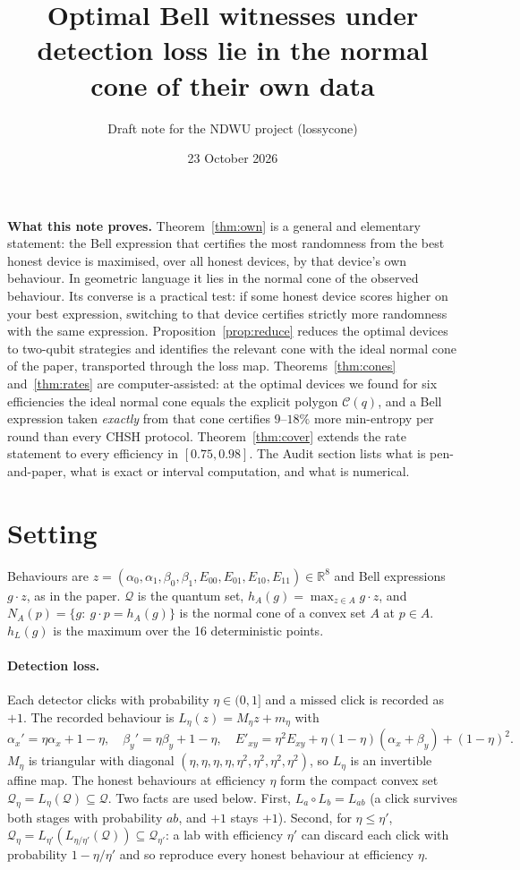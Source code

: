 \documentclass[11pt]{article}
\title{Optimal Bell witnesses under detection loss lie in the normal cone of their own data}
\author{Draft note for the NDWU project (lossycone)}
\date{23 October 2026}
\theoremstyle{definition}\newtheorem{definition}{Definition}
\theoremstyle{remark}\newtheorem{remark}{Remark}
\newcommand{\Q}{\mathcal Q}
\newcommand{\R}{\mathbb R}
\begin{document}
\maketitle

\noindent\textbf{What this note proves.} Theorem~\ref{thm:own} is a general and elementary statement: the Bell expression that certifies the most randomness from the best honest device is maximised, over all honest devices, by that device's own behaviour. In geometric language it lies in the normal cone of the observed behaviour. Its converse is a practical test: if some honest device scores higher on your best expression, switching to that device certifies strictly more randomness with the same expression. Proposition~\ref{prop:reduce} reduces the optimal devices to two-qubit strategies and identifies the relevant cone with the ideal normal cone of the paper, transported through the loss map. Theorems~\ref{thm:cones} and~\ref{thm:rates} are computer-assisted: at the optimal devices we found for six efficiencies the ideal normal cone equals the explicit polygon $\mathcal C(q)$, and a Bell expression taken \emph{exactly} from that cone certifies $9$--$18\%$ more min-entropy per round than every CHSH protocol. Theorem~\ref{thm:cover} extends the rate statement to every efficiency in $[0.75,0.98]$. The Audit section lists what is pen-and-paper, what is exact or interval computation, and what is numerical.

\section{Setting}
Behaviours are $z=(\alpha_0,\alpha_1,\beta_0,\beta_1,E_{00},E_{01},E_{10},E_{11})\in\R^8$ and Bell expressions $g\cdot z$, as in the paper. $\Q$ is the quantum set, $h_A(g)=\max_{z\in A}g\cdot z$, and $N_A(p)=\{g:\ g\cdot p=h_A(g)\}$ is the normal cone of a convex set $A$ at $p\in A$. $h_L(g)$ is the maximum over the 16 deterministic points.

\paragraph{Detection loss.} Each detector clicks with probability $\eta\in(0,1]$ and a missed click is recorded as $+1$. The recorded behaviour is $L_\eta(z)=M_\eta z+m_\eta$ with
\[
\alpha_x'=\eta\alpha_x+1-\eta,\quad \beta_y'=\eta\beta_y+1-\eta,\quad E'_{xy}=\eta^2E_{xy}+\eta(1-\eta)(\alpha_x+\beta_y)+(1-\eta)^2 .
\]
$M_\eta$ is triangular with diagonal $(\eta,\eta,\eta,\eta,\eta^2,\eta^2,\eta^2,\eta^2)$, so $L_\eta$ is an invertible affine map. The honest behaviours at efficiency $\eta$ form the compact convex set $\Q_\eta=L_\eta(\Q)\subseteq\Q$. Two facts are used below. First, $L_a\circ L_b=L_{ab}$ (a click survives both stages with probability $ab$, and $+1$ stays $+1$). Second, for $\eta\le\eta'$, $\Q_\eta=L_{\eta'}(L_{\eta/\eta'}(\Q))\subseteq\Q_{\eta'}$: a lab with efficiency $\eta'$ can discard each click with probability $1-\eta/\eta'$ and so reproduce every honest behaviour at efficiency $\eta$.
\end{document}
